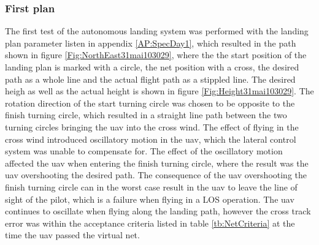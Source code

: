 \subsubsection{First plan}\label{sss:Day1FirstPlan}
The first test of the autonomous landing system was performed with the landing plan parameter listen in appendix \ref{AP:SpecDay1}, which resulted in the path shown in figure \ref{Fig:NorthEast31mai103029}, where the the start position of the landing plan is marked with a circle, the net position with a cross, the desired path as a whole line and the actual flight path as a stippled line. The desired heigh as well as the actual height is shown in figure \ref{Fig:Height31mai103029}. The rotation direction of the start turning circle was chosen to be opposite to the finish turning circle, which resulted in a straight line path between the two turning circles bringing the \gls{uav} into the cross wind. The effect of flying in the cross wind introduced oscillatory motion in the \gls{uav}, which the lateral control system was unable to compensate for. The effect of the oscillatory motion affected the \gls{uav} when entering the finish turning circle, where the result was the \gls{uav} overshooting the desired path. The consequence of the \gls{uav} overshooting the finish turning circle can in the worst case result in the \gls{uav} to leave the line of sight of the pilot, which is a failure when flying in a LOS operation. The \gls{uav} continues to oscillate when flying along the landing path, however the cross track error was within the acceptance criteria listed in table \ref{tb:NetCriteria} at the time the \gls{uav} passed the virtual net.

